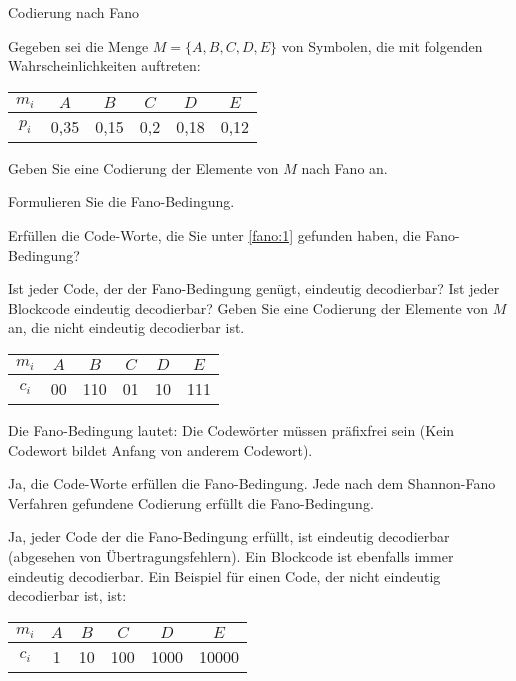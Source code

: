 \documentclass{exercisesheet}
\begin{document}
\begin{eexercises}{Codierung nach Fano}{
    Gegeben sei die Menge $M = \{A, B, C, D, E\}$ von Symbolen, die mit folgenden Wahrscheinlichkeiten auftreten:
    \centering\begin{tabular}{c|ccccc}
      $m_i$ & $A$  & $B$  & $C$ & $D$  & $E$  \\
      \hline
      $p_i$ & 0,35 & 0,15 & 0,2 & 0,18 & 0,12 \\
    \end{tabular}
  }
  \item\label{fano:1} Geben Sie eine Codierung der Elemente von $M$ nach Fano an.\points[7]
  \item Formulieren Sie die Fano-Bedingung.\points
  \item Erfüllen die Code-Worte, die Sie unter \ref{fano:1} gefunden haben, die Fano-Bedingung?\points
  \item Ist jeder Code, der der Fano-Bedingung genügt, eindeutig decodierbar? Ist jeder Blockcode eindeutig decodierbar? Geben Sie eine Codierung der Elemente von $M$ an, die nicht eindeutig decodierbar ist.\points[3]
\end{eexercises}

\begin{solutions}
  \item
  \begin{tabular}{c|ccccc}
    $m_i$ & $A$ & $B$ & $C$ & $D$ & $E$ \\
    \hline
    $c_i$ & 00  & 110 & 01  & 10  & 111 \\
  \end{tabular}
  \item Die Fano-Bedingung lautet: Die Codewörter müssen präfixfrei sein (Kein Codewort bildet Anfang von anderem Codewort).
  \item Ja, die Code-Worte erfüllen die Fano-Bedingung. Jede nach dem Shannon-Fano Verfahren gefundene Codierung erfüllt die Fano-Bedingung.
  \item Ja, jeder Code der die Fano-Bedingung erfüllt, ist eindeutig decodierbar (abgesehen von Übertragungsfehlern). Ein Blockcode ist ebenfalls immer eindeutig decodierbar. Ein Beispiel für einen Code, der nicht eindeutig decodierbar ist, ist:\par
  \begin{tabular}{c|ccccc}
    $m_i$ & $A$ & $B$ & $C$ & $D$  & $E$   \\
    \hline
    $c_i$ & 1   & 10  & 100 & 1000 & 10000 \\
  \end{tabular}
\end{solutions}
\end{document}
